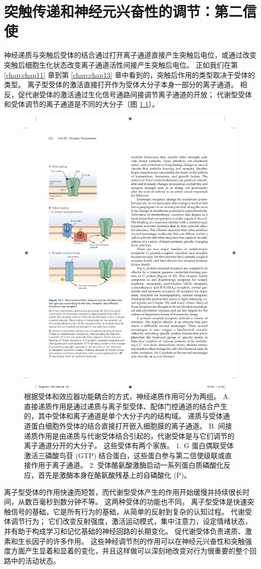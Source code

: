 \chapter{突触传递和神经元兴奋性的调节：第二信使} \label{chap:chap14}
神经递质与突触后受体的结合通过打开离子通道直接产生突触后电位，或通过改变突触后细胞生化状态改变离子通道活性间接产生突触后电位。 
正如我们在第 \ref{chap:chap11} 章到第 \ref{chap:chap13} 章中看到的，突触后作用的类型取决于受体的类型。 
离子型受体的激活直接打开作为受体大分子本身一部分的离子通道。 
相反，促代谢受体的激活通过生化信号通路间接调节离子通道的开放； 
代谢型受体和受体调节的离子通道是不同的大分子（图 \ref{fig:14_1}）。

\begin{figure}[htbp]
	\centering
	\includegraphics[width=0.5\linewidth]{chap14/fig_14_1}
	\caption{根据受体和效应器功能耦合的方式，神经递质作用可分为两组。 A. 直接递质作用是通过递质与离子型受体、配体门控通道的结合产生的，其中受体和离子通道是单个大分子内的结构域。 递质与受体通道蛋白细胞外受体的结合直接打开嵌入细胞膜的离子通道。 B. 间接递质作用是由递质与代谢受体结合引起的，代谢受体是与它们调节的离子通道分开的大分子。 这些受体有两个家族。 1. G 蛋白偶联受体激活三磷酸鸟苷 (GTP) 结合蛋白，这些蛋白参与第二信使级联或直接作用于离子通道。 2. 受体酪氨酸激酶启动一系列蛋白质磷酸化反应，首先是激酶本身在酪氨酸残基上的自磷酸化 (P)。}
	\label{fig:14_1}
\end{figure}


离子型受体的作用快速而短暂，而代谢型受体产生的作用开始缓慢并持续很长时间，从数百毫秒到数分钟不等。 
这两种受体的功能也不同。
离子型受体是快速突触信号的基础，它是所有行为的基础，从简单的反射到复杂的认知过程。
代谢受体调节行为；
它们改变反射强度，激活运动模式，集中注意力，设定情绪状态，并有助于构成学习和记忆基础的神经回路的长期变化。
促代谢受体负责递质、激素和生长因子的许多作用。
这些神经调节剂的作用可以在神经元兴奋性和突触强度方面产生显着和显着的变化，并且这样做可以深刻地改变对行为很重要的整个回路中的活动状态。


